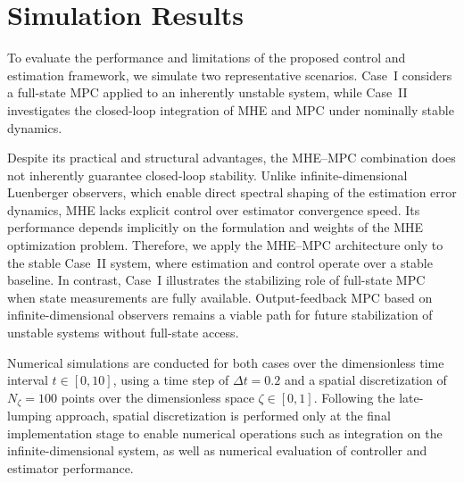 \section{Simulation Results} \label{sec:3_6_results}



To evaluate the performance and limitations of the proposed control and estimation framework, we simulate two representative scenarios. Case~I considers a full-state MPC applied to an inherently unstable system, while Case~II investigates the closed-loop integration of MHE and MPC under nominally stable dynamics.

Despite its practical and structural advantages, the MHE--MPC combination does not inherently guarantee closed-loop stability. Unlike infinite-dimensional Luenberger observers, which enable direct spectral shaping of the estimation error dynamics, MHE lacks explicit control over estimator convergence speed. Its performance depends implicitly on the formulation and weights of the MHE optimization problem. Therefore, we apply the MHE--MPC architecture only to the stable Case~II system, where estimation and control operate over a stable baseline. In contrast, Case~I illustrates the stabilizing role of full-state MPC when state measurements are fully available. Output-feedback MPC based on infinite-dimensional observers remains a viable path for future stabilization of unstable systems without full-state access\autocite{Khatibi2021Model,Moadeli2025Observer}.

Numerical simulations are conducted for both cases over the dimensionless time interval $t \in [0, 10]$, using a time step of $\Delta t = 0.2$ and a spatial discretization of $N_\zeta = 100$ points over the dimensionless space $\zeta \in [0, 1]$. Following the late-lumping approach, spatial discretization is performed only at the final implementation stage to enable numerical operations such as integration on the infinite-dimensional system, as well as numerical evaluation of controller and estimator performance.

